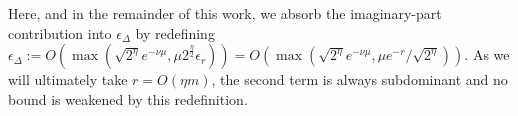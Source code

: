 \documentclass[aps,floatfix,10pt,amssymb,amsfont,amsmath,superscriptaddress,float,nofootinbib,longbibliography,nobalancelastpage,twocolumn]{revtex4-2}
\begin{document}
Here, and in the remainder of this work, we absorb the imaginary-part contribution into $\epsilon_{\Delta}$ by redefining $\epsilon_{\Delta} := O(\max(\sqrt{2^{\eta}}e^{-\nu\mu},\mu 2^{\frac{\eta}{2}}\epsilon_r)) = O(\max(\sqrt{2^{\eta}}e^{-\nu\mu},\mu e^{-r}/\sqrt{2^{\eta}}))$. As we will ultimately take $r = O(\eta m)$, the second term is always subdominant and no bound is weakened by this redefinition.






\end{document}
